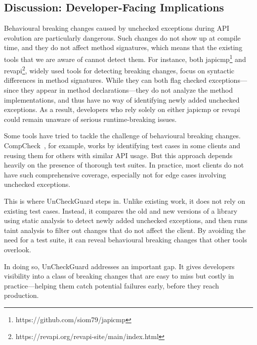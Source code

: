 \subsection{Discussion: Developer-Facing Implications}

Behavioural breaking changes caused by unchecked exceptions during API evolution are particularly dangerous. Such changes do not show up at compile time, and they do not affect method signatures, which means that the existing tools that we are aware of cannot detect them. For instance, both japicmp\footnote{https://github.com/siom79/japicmp} and revapi\footnote{https://revapi.org/revapi-site/main/index.html}, widely used tools for detecting breaking changes, focus on syntactic differences in method signatures. While they can both flag checked exceptions—since they appear in method declarations—they do not analyze the method implementations, and thus have no way of identifying newly added unchecked exceptions. As a result, developers who rely solely on either japicmp or revapi could remain unaware of serious runtime-breaking issues.

Some tools have tried to tackle the challenge of behavioural breaking changes. CompCheck~\cite{CompCheck}, for example, works by identifying test cases in some clients and reusing them for others with similar API usage. But this approach depends heavily on the presence of thorough test suites. In practice, most clients do not have such comprehensive coverage, especially not for edge cases involving unchecked exceptions.

This is where UnCheckGuard steps in. Unlike existing work, it does not rely on existing test cases. Instead, it compares the old and new versions of a library using static analysis to detect newly added unchecked exceptions, and then runs taint analysis to filter out changes that do not affect the client. By avoiding the need for a test suite, it can reveal behavioural breaking changes that other tools overlook.

In doing so, UnCheckGuard addresses an important gap. It gives developers visibility into a class of breaking changes that are easy to miss but costly in practice—helping them catch potential failures early, before they reach production.
